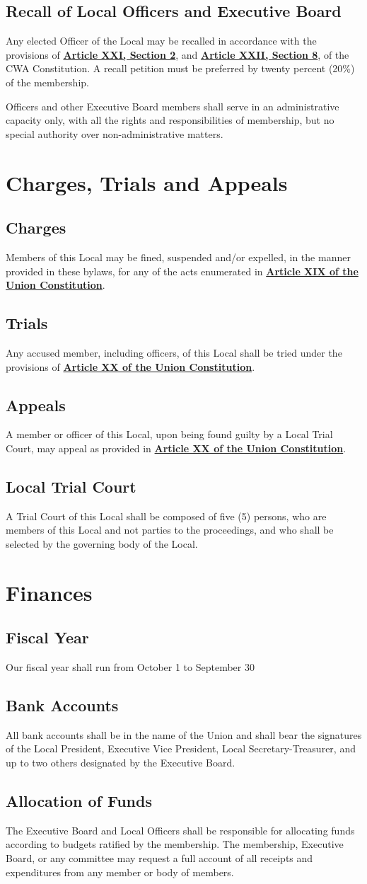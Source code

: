 \documentclass[11pt]{article}
\let\oldhref\href
\renewcommand{\href}[2]{\oldhref{#1}{\bfseries#2}}
\newcommand{\article}[1]{\vspace{.50cm}\section{#1}}
\newcommand{\articlesection}[1]{\vspace{.25cm}\subsection{#1}}
\begin{document}
\articlesection{Recall of Local Officers and Executive Board}
\begin{paralist}
  \item Any elected Officer of the Local may be recalled in accordance with the provisions of \href{https://cwa-union.org/for-locals/cwa-constitution\#A21}{Article XXI, Section 2}, and \href{https://cwa-union.org/for-locals/cwa-constitution\#A22}{Article XXII, Section 8}, of the CWA Constitution. A recall petition must be preferred by twenty percent (20\%) of the membership.
  \item Officers and other Executive Board members shall serve in an administrative capacity only, with all the rights and responsibilities of membership, but no special authority over non-administrative matters.
\end{paralist}

\article{Charges, Trials and Appeals}
\articlesection{Charges}
Members of this Local may be fined, suspended and/or expelled, in the manner provided in these bylaws, for any of  the acts enumerated in \href{https://cwa-union.org/for-locals/cwa-constitution\#A19}{Article XIX of the Union Constitution}.

\articlesection{Trials}
Any accused member, including officers, of this Local shall be tried under the provisions of \href{https://cwa-union.org/for-locals/cwa-constitution\#A20}{Article XX of the Union  Constitution}.

\articlesection{Appeals}
A member or officer of this Local, upon being found guilty by a Local Trial Court, may appeal as provided in \href{https://cwa-union.org/for-locals/cwa-constitution\#A20}{Article XX of the Union Constitution}.

\articlesection{Local Trial Court}
A Trial Court of this Local shall be composed of five (5) persons, who are members of this Local and not parties to the proceedings, and who shall be selected by the governing body of the Local.

\article{Finances}
\articlesection{Fiscal Year}
Our fiscal year shall run from October 1 to September 30

\articlesection{Bank Accounts}
All bank accounts shall be in the name of the Union and shall bear the signatures of the Local President, Executive Vice President, Local Secretary-Treasurer, and up to two others designated by the Executive Board.

\articlesection{Allocation of Funds}
The Executive Board and Local Officers shall be responsible for allocating funds according to budgets ratified by the membership. The membership, Executive Board, or any committee may request a full account of all receipts and expenditures from any member or body of members.
\end{document}
